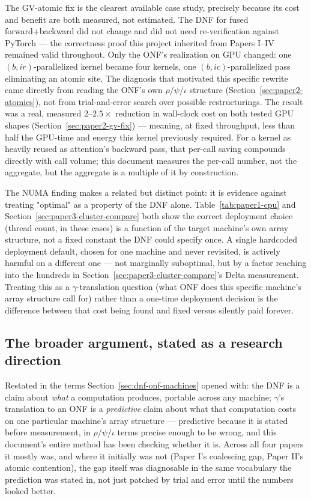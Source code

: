 \documentclass[11pt]{article}
\begin{document}
The GV-atomic fix is the clearest available case study, precisely
because its cost and benefit are both measured, not estimated. The
DNF for fused forward+backward did not change and did not need
re-verification against PyTorch --- the correctness proof this project
inherited from Papers I--IV remained valid throughout. Only the ONF's
realization on GPU changed: one $(b,ir)$-parallelized kernel became
four kernels, one $(b,ic)$-parallelized pass eliminating an atomic site.
The diagnosis that motivated this specific rewrite came directly from
reading the ONF's own $\rho$/$\psi$/$\iota$ structure
(Section~\ref{sec:paper2-atomics}), not from trial-and-error search
over possible restructurings. The result was a real, measured
$2$--$2.5\times$ reduction in wall-clock cost on both tested GPU shapes
(Section~\ref{sec:paper2-gv-fix}) --- meaning, at fixed throughput,
less than half the GPU-time and energy this kernel previously required.
For a kernel as heavily reused as attention's backward pass, that
per-call saving compounds directly with call volume; this document
measures the per-call number, not the aggregate, but the aggregate is
a multiple of it by construction.

The NUMA finding makes a related but distinct point: it is evidence
against treating "optimal" as a property of the DNF alone.
Table~\ref{tab:paper1-cpu} and Section~\ref{sec:paper3-cluster-compare}
both show the correct deployment choice (thread count, in these cases)
is a function of the target machine's own array structure, not a fixed
constant the DNF could specify once. A single hardcoded deployment
default, chosen for one machine and never revisited, is actively
harmful on a different one --- not marginally suboptimal, but by a
factor reaching into the hundreds in Section~\ref{sec:paper3-cluster-compare}'s
Delta measurement. Treating this as a $\gamma$-translation question
(what ONF does this specific machine's array structure call for) rather
than a one-time deployment decision is the difference between that cost
being found and fixed versus silently paid forever.

\subsection{The broader argument, stated as a research direction}

Restated in the terms Section~\ref{sec:dnf-onf-machines} opened with:
the DNF is a claim about \emph{what} a computation produces, portable
across any machine; $\gamma$'s translation to an ONF is a
\emph{predictive} claim about what that computation costs on one
particular machine's array structure --- predictive because it is
stated before measurement, in $\rho$/$\psi$/$\iota$ terms precise
enough to be wrong, and this document's entire method has been
checking whether it is. Across all four papers it mostly was, and
where it initially was not (Paper I's coalescing gap, Paper II's atomic
contention), the gap itself was diagnosable in the same vocabulary the
prediction was stated in, not just patched by trial and error until the
numbers looked better.
\end{document}
